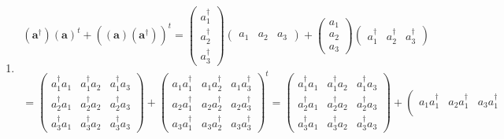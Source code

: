 \documentclass[aps,preprint]{revtex4}
\begin{document}
\begin{enumerate}
\begin{enumerate}
\begin{enumerate}
\item 
\begin{gather}
\left( \mathbf{a}^{\dagger }\right) \left( \mathbf{a}\right) ^{t}+\left( 
\overset{}{\left( \mathbf{a}\right) \left( \mathbf{a}^{\dagger }\right) }%
\right) ^{t}=\left( 
\begin{array}{c}
a_{1}^{\dagger } \\ 
a_{2}^{\dagger } \\ 
a_{3}^{\dagger }%
\end{array}%
\right) \left( 
\begin{array}{ccc}
a_{1} & a_{2} & a_{3}%
\end{array}%
\right) +\left( 
\begin{array}{c}
a_{1} \\ 
a_{2} \\ 
a_{3}%
\end{array}%
\right) \left( 
\begin{array}{ccc}
a_{1}^{\dagger } & a_{2}^{\dagger } & a_{3}^{\dagger }%
\end{array}%
\right) \\
=\left( 
\begin{array}{ccc}
a_{1}^{\dagger }a_{1} & a_{1}^{\dagger }a_{2} & a_{1}^{\dagger }a_{3} \\ 
a_{2}^{\dagger }a_{1} & a_{2}^{\dagger }a_{2} & a_{2}^{\dagger }a_{3} \\ 
a_{3}^{\dagger }a_{1} & a_{3}^{\dagger }a_{2} & a_{3}^{\dagger }a_{3}%
\end{array}%
\right) +\left( 
\begin{array}{ccc}
a_{1}a_{1}^{\dagger } & a_{1}a_{2}^{\dagger } & a_{1}a_{3}^{\dagger } \\ 
a_{2}a_{1}^{\dagger } & a_{2}a_{2}^{\dagger } & a_{2}a_{3}^{\dagger } \\ 
a_{3}a_{1}^{\dagger } & a_{3}a_{2}^{\dagger } & a_{3}a_{3}^{\dagger }%
\end{array}%
\right) ^{t}=\left( 
\begin{array}{ccc}
a_{1}^{\dagger }a_{1} & a_{1}^{\dagger }a_{2} & a_{1}^{\dagger }a_{3} \\ 
a_{2}^{\dagger }a_{1} & a_{2}^{\dagger }a_{2} & a_{2}^{\dagger }a_{3} \\ 
a_{3}^{\dagger }a_{1} & a_{3}^{\dagger }a_{2} & a_{3}^{\dagger }a_{3}%
\end{array}%
\right) +\left( 
\begin{array}{ccc}
a_{1}a_{1}^{\dagger } & a_{2}a_{1}^{\dagger } & a_{3}a_{1}^{\dagger } \\ 

\end{array}
\end{gather}
\end{enumerate}
\end{enumerate}
\end{enumerate}
\end{document}
